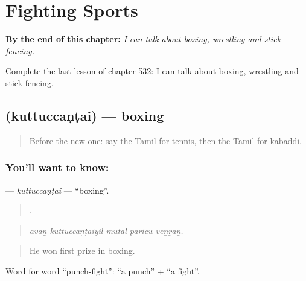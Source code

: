 
\chapter{Fighting Sports}
\label{ch:ta-fighting-sports}

\begin{chapteropening}
\textbf{By the end of this chapter:} \emph{I can talk about boxing, wrestling and stick fencing.}

Complete the last lesson of chapter 532: I can talk about boxing, wrestling and stick fencing.
\end{chapteropening}

\section[\texorpdfstring{\ta{குத்துச்சண்டை} (kuttuccaṇṭai)}{குத்துச்சண்டை (kuttuccaṇṭai)}]{ (kuttuccaṇṭai) — boxing}

\label{lesson:TA-C532-kuttuccantai}



\begin{quote}
Before the new one: say the Tamil for tennis, then the Tamil for kabaddi.
\end{quote}

\subsection*{You'll want to know: }
\textbf{} — \emph{kuttuccaṇṭai} — \textquotedblleft{}boxing\textquotedblright{}.

\begin{quote}
    .
\end{quote}

\begin{quote}
\emph{avaṉ kuttuccaṇṭaiyil mutal paricu veṉṟāṉ.}
\end{quote}

\begin{quote}
He won first prize in boxing.
\end{quote}

Word for word \textquotedblleft{}punch-fight\textquotedblright{}:  \textquotedblleft{}a punch\textquotedblright{} +  \textquotedblleft{}a fight\textquotedblright{}.


